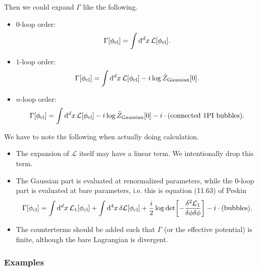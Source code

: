 \documentclass{article}
\begin{document}
Then we could expand $\Gamma$ like the following.
\begin{itemize}
    \item $0$-loop order:
    \[ \Gamma[\phi_{\textnormal{cl}}] = \int \dd[d]{x} \mathcal{L}[\phi_{\textnormal{cl}}]. \]
    \item $1$-loop order:
    \[ \Gamma[\phi_{\textnormal{cl}}] = \int \dd[d]{x} \mathcal{L}[\phi_{\textnormal{cl}}] - i \log \tilde{Z}_{\text{Gaussian}}[0]. \]
    \item $n$-loop order:
    \[ \Gamma[\phi_{\textnormal{cl}}] = \int \dd[d]{x} \mathcal{L}[\phi_{\textnormal{cl}}] - i \log \tilde{Z}_{\text{Gaussian}}[0] - i\cdot \qty(\text{connected 1PI bubbles}). \]
\end{itemize}
We have to note the following when actually doing calculation.
\begin{itemize}
    \item The expansion of $\mathcal{L}$ itself may have a linear term.
    We intentionally drop this term.
    \item The Gaussian part is evaluated at renormalized parameters, while the $0$-loop part is evaluated at bare parameters, i.e. this is equation (11.63) of Peskin
    \[ \Gamma[\phi_{\textnormal{cl}}] = \int \dd[d]{x} \mathcal{L}_1[\phi_{\textnormal{cl}}] + \int \dd[4]{x} \delta\mathcal{L}[\phi_{\textnormal{cl}}] + \frac{i}{2} \log \det[-\frac{\delta^2\mathcal{L}_1}{\delta\phi\delta\phi}] - i\cdot (\text{bubbles}). \]
    \item The counterterms should be added such that $\Gamma$ (or the effective potential) is finite, although the bare Lagrangian is divergent.
\end{itemize}

\subsubsection{Examples}
\end{document}
